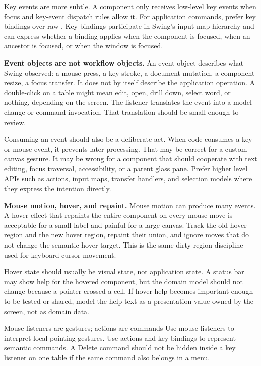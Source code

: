 Key events are more subtle. A component only receives low-level key events when focus and key-event dispatch rules allow it. For application commands, prefer key bindings over raw . Key bindings participate in Swing's input-map hierarchy and can express whether a binding applies when the component is focused, when an ancestor is focused, or when the window is focused.

\textbf{Event objects are not workflow objects.} An event object describes what Swing observed: a mouse press, a key stroke, a
document mutation, a component resize, a focus transfer. It does not by itself
describe the application operation. A double-click on a table might mean edit,
open, drill down, select word, or nothing, depending on the screen. The listener
translates the event into a model change or command invocation. That translation
should be small enough to review.

Consuming an event should also be a deliberate act. When code consumes a key or
mouse event, it prevents later processing. That may be correct for a custom
canvas gesture. It may be wrong for a component that should cooperate with text
editing, focus traversal, accessibility, or a parent glass pane. Prefer higher
level APIs such as actions, input maps, transfer handlers, and selection models
where they express the intention directly.

\textbf{Mouse motion, hover, and repaint.} Mouse motion can produce many events. A hover effect that repaints the entire
component on every mouse move is acceptable for a small label and painful for a
large canvas. Track the old hover region and the new hover region, repaint their
union, and ignore moves that do not change the semantic hover target. This is
the same dirty-region discipline used for keyboard cursor movement.

Hover state should usually be visual state, not application state. A status bar
may show help for the hovered component, but the domain model should not change
because a pointer crossed a cell. If hover help becomes important enough to be
tested or shared, model the help text as a presentation value owned by the
screen, not as domain data.

\begin{principlebox}{Mouse listeners are gestures; actions are commands}
Use mouse listeners to interpret local pointing gestures. Use actions and key bindings to represent semantic commands. A Delete command should not be hidden inside a key listener on one table if the same command also belongs in a menu.
\end{principlebox}

